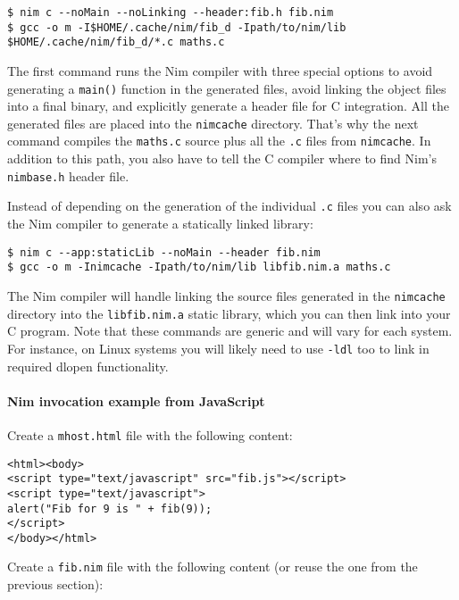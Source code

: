 \begin{verbatim}
$ nim c --noMain --noLinking --header:fib.h fib.nim
$ gcc -o m -I$HOME/.cache/nim/fib_d -Ipath/to/nim/lib $HOME/.cache/nim/fib_d/*.c maths.c
\end{verbatim}

The first command runs the Nim compiler with three special options to
avoid generating a \texttt{main()} function in the generated files,
avoid linking the object files into a final binary, and explicitly
generate a header file for C integration. All the generated files are
placed into the \texttt{nimcache} directory. That's why the next command
compiles the \texttt{maths.c} source plus all the \texttt{.c} files from
\texttt{nimcache}. In addition to this path, you also have to tell the C
compiler where to find Nim's \texttt{nimbase.h} header file.

Instead of depending on the generation of the individual \texttt{.c}
files you can also ask the Nim compiler to generate a statically linked
library:

\begin{verbatim}
$ nim c --app:staticLib --noMain --header fib.nim
$ gcc -o m -Inimcache -Ipath/to/nim/lib libfib.nim.a maths.c
\end{verbatim}

The Nim compiler will handle linking the source files generated in the
\texttt{nimcache} directory into the \texttt{libfib.nim.a} static
library, which you can then link into your C program. Note that these
commands are generic and will vary for each system. For instance, on
Linux systems you will likely need to use \texttt{-ldl} too to link in
required dlopen functionality.

\hypertarget{nim-invocation-example-from-javascript}{%
\paragraph{Nim invocation example from
JavaScript}\label{nim-invocation-example-from-javascript}}

Create a \texttt{mhost.html} file with the following content:

\begin{verbatim}
<html><body>
<script type="text/javascript" src="fib.js"></script>
<script type="text/javascript">
alert("Fib for 9 is " + fib(9));
</script>
</body></html>
\end{verbatim}

Create a \texttt{fib.nim} file with the following content (or reuse the
one from the previous section):


